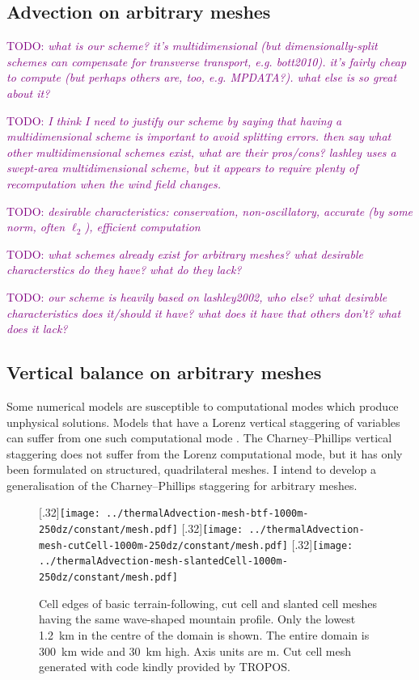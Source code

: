 \documentclass[a4paper,11pt]{article}
\newcommand{\TODO}[1]{\textcolor{purple}{TODO: \emph{#1}}}
\begin{document}
\subsection*{Advection on arbitrary meshes}
\TODO{what is our scheme?  it's multidimensional (but dimensionally-split schemes can compensate for transverse transport, e.g. bott2010).  it's fairly cheap to compute (but perhaps others are, too, e.g. MPDATA?).  what else is so great about it?}

\TODO{I think I need to justify our scheme by saying that having a multidimensional scheme is important to avoid splitting errors.  then say what other multidimensional schemes exist, what are their pros/cons?  lashley uses a swept-area multidimensional scheme, but it appears to require plenty of recomputation when the wind field changes.}

\TODO{desirable characteristics: conservation, non-oscillatory, accurate (by some norm, often $\ell_2$), efficient computation}

\TODO{what schemes already exist for arbitrary meshes?  what desirable characterstics do they have?  what do they lack?}

\TODO{our scheme is heavily based on lashley2002, who else?  what desirable characteristics does it/should it have?  what does it have that others don't?  what does it lack?}

\subsection*{Vertical balance on arbitrary meshes}
Some numerical models are susceptible to computational modes which produce unphysical solutions.   Models that have a Lorenz vertical staggering of variables can suffer from one such computational mode \citep{arakawa-konor1996}.  The Charney--Phillips vertical staggering does not suffer from the Lorenz computational mode, but it has only been formulated on structured, quadrilateral meshes.  I intend to develop a generalisation of the Charney--Phillips staggering for arbitrary meshes.

\begin{figure}
	\centering
	[.32\linewidth]{\texttt{[image: ../thermalAdvection-mesh-btf-1000m-250dz/constant/mesh.pdf]}}
	[.32\linewidth]{\texttt{[image: ../thermalAdvection-mesh-cutCell-1000m-250dz/constant/mesh.pdf]}}
	[.32\linewidth]{\texttt{[image: ../thermalAdvection-mesh-slantedCell-1000m-250dz/constant/mesh.pdf]}}
	\caption{Cell edges of basic terrain-following, cut cell and slanted cell meshes having the same wave-shaped mountain profile.  Only the lowest \SI{1.2}{\kilo\meter} in the centre of the domain is shown.  The entire domain is \SI{300}{\kilo\meter} wide and \SI{30}{\kilo\meter} high.  Axis units are \si{\meter}.  Cut cell mesh generated with code kindly provided by TROPOS.}
	\label{fig:meshes}
\end{figure}
\end{document}
